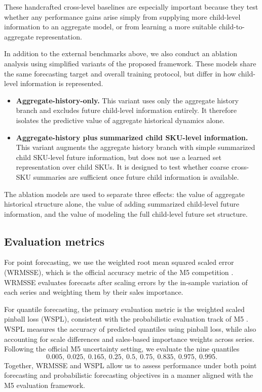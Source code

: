\documentclass[12pt]{article}
\begin{document}
These handcrafted cross-level baselines are especially important because they test whether any performance gains arise simply from supplying more child-level information to an aggregate model, or from learning a more suitable child-to-aggregate representation.

In addition to the external benchmarks above, we also conduct an ablation analysis using simplified variants of the proposed framework. These models share the same forecasting target and overall training protocol, but differ in how child-level information is represented.

\begin{itemize}
  \item \textbf{Aggregate-history-only.}
        This variant uses only the aggregate history branch and excludes future child-level information entirely. It therefore isolates the predictive value of aggregate historical dynamics alone.

  \item \textbf{Aggregate-history plus summarized child SKU-level information.}
        This variant augments the aggregate history branch with simple summarized child SKU-level future information, but does not use a learned set representation over child SKUs. It is designed to test whether coarse cross-SKU summaries are sufficient once future child information is available.
\end{itemize}

The ablation models are used to separate three effects: the value of aggregate historical structure alone, the value of adding summarized child-level future information, and the value of modeling the full child-level future set structure.

\subsection{Evaluation metrics}

For point forecasting, we use the weighted root mean squared scaled error (WRMSSE), which is the official accuracy metric of the M5 competition \parencite{makridakis2022m5accuracy}. WRMSSE evaluates forecasts after scaling errors by the in-sample variation of each series and weighting them by their sales importance. 

For quantile forecasting, the primary evaluation metric is the weighted scaled pinball loss (WSPL), consistent with the probabilistic evaluation track of M5 \parencite{makridakis2022m5uncertainty}. WSPL measures the accuracy of predicted quantiles using pinball loss, while also accounting for scale differences and sales-based importance weights across series. Following the official M5 uncertainty setting, we evaluate the nine quantiles
\[
  0.005,\ 0.025,\ 0.165,\ 0.25,\ 0.5,\ 0.75,\ 0.835,\ 0.975,\ 0.995.
\]
Together, WRMSSE and WSPL allow us to assess performance under both point forecasting and probabilistic forecasting objectives in a manner aligned with the M5 evaluation framework.
\end{document}
